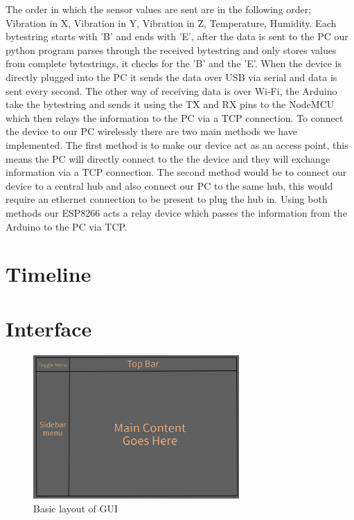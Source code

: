 \documentclass[12pt, titlepage]{article}
\begin{document}
The order in which the sensor values are sent are in the following order; Vibration in X, Vibration in Y, Vibration in Z, Temperature, Humidity. Each bytestring starts with 'B' and ends with 'E', after the data is sent to the PC our python program parses through the received bytestring and only stores values from complete bytestrings, it checks for the 'B' and the 'E'. When the device is directly plugged into the PC it sends the data over USB via serial and data is sent every second. The other way of receiving data is over Wi-Fi, the Arduino take the bytestring and sends it using the TX and RX pins to the NodeMCU which then relays the information to the PC via a TCP connection.
\newline
\newline
To connect the device to our PC wirelessly there are two main methods we have implemented. The first method is to make our device act as an access point, this means the PC will directly connect to the the device and they will exchange information via a TCP connection. The second method would be to connect our device to a central hub and also connect our PC to the same hub, this would require an ethernet connection to be present to plug the hub in. Using both methods our ESP8266 acts a relay device which passes the information from the Arduino to the PC via TCP.



\section{Timeline}


% 

\newpage{}

\appendix

\section{Interface}
\begin{figure}[h!]
  \begin{center}
  \includegraphics[width=0.7\textwidth]{GUI_sketch}
  \caption{Basic layout of GUI}
  \label{Fig_SystemContext} 
  \end{center}
  \end{figure}
\end{document}
